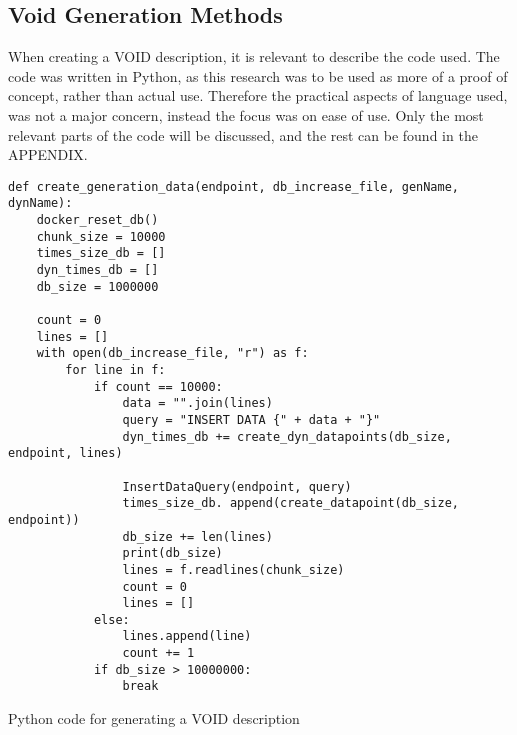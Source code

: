 \subsection{Void Generation Methods}\label{sec:voidmethods}
When creating a VOID description, it is relevant to describe the code used. The code was written in Python, as this research was to be used as more of a proof of concept, rather than actual use. Therefore the practical aspects of language used, was not a major concern, instead the focus was on ease of use. Only the most relevant parts of the code will be discussed, and the rest can be found in the APPENDIX.

\begin{listing}[htb!]
    \begin{verbatim}
def create_generation_data(endpoint, db_increase_file, genName, dynName):
    docker_reset_db()
    chunk_size = 10000
    times_size_db = []
    dyn_times_db = []
    db_size = 1000000

    count = 0
    lines = []
    with open(db_increase_file, "r") as f:
        for line in f:
            if count == 10000:
                data = "".join(lines)
                query = "INSERT DATA {" + data + "}"
                dyn_times_db += create_dyn_datapoints(db_size, endpoint, lines)

                InsertDataQuery(endpoint, query)
                times_size_db. append(create_datapoint(db_size, endpoint))
                db_size += len(lines)
                print(db_size)
                lines = f.readlines(chunk_size)
                count = 0
                lines = []
            else:
                lines.append(line)
                count += 1
            if db_size > 10000000:
                break
    \end{verbatim}
    \caption{Python code for generating a VOID description}
    \label{lst:create_generation_data}
\end{listing}

